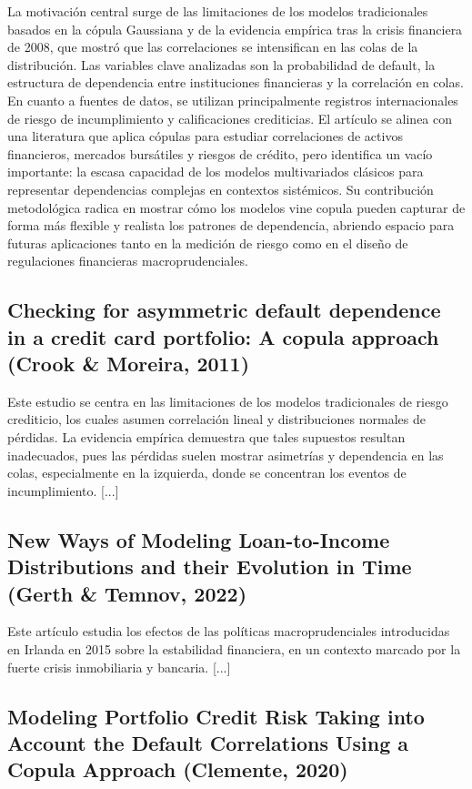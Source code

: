 \documentclass[11pt,a4paper]{article}
\begin{document}
La motivación central surge de las limitaciones de los modelos tradicionales basados en la cópula Gaussiana \parencite{li1999} y de la evidencia empírica tras la crisis financiera de 2008, que mostró que las correlaciones se intensifican en las colas de la distribución. Las variables clave analizadas son la probabilidad de default, la estructura de dependencia entre instituciones financieras y la correlación en colas. En cuanto a fuentes de datos, se utilizan principalmente registros internacionales de riesgo de incumplimiento y calificaciones crediticias. El artículo se alinea con una literatura que aplica cópulas para estudiar correlaciones de activos financieros, mercados bursátiles y riesgos de crédito, pero identifica un vacío importante: la escasa capacidad de los modelos multivariados clásicos para representar dependencias complejas en contextos sistémicos. Su contribución metodológica radica en mostrar cómo los modelos vine copula pueden capturar de forma más flexible y realista los patrones de dependencia, abriendo espacio para futuras aplicaciones tanto en la medición de riesgo como en el diseño de regulaciones financieras macroprudenciales.

\subsection{Checking for asymmetric default dependence in a credit card portfolio: A copula approach (Crook \& Moreira, 2011)}

Este estudio se centra en las limitaciones de los modelos tradicionales de riesgo crediticio, los cuales asumen correlación lineal y distribuciones normales de pérdidas. La evidencia empírica demuestra que tales supuestos resultan inadecuados, pues las pérdidas suelen mostrar asimetrías y dependencia en las colas, especialmente en la izquierda, donde se concentran los eventos de incumplimiento. [...]

\subsection{New Ways of Modeling Loan-to-Income Distributions and their Evolution in Time (Gerth \& Temnov, 2022)}

Este artículo estudia los efectos de las políticas macroprudenciales introducidas en Irlanda en 2015 sobre la estabilidad financiera, en un contexto marcado por la fuerte crisis inmobiliaria y bancaria. [...]

\subsection{Modeling Portfolio Credit Risk Taking into Account the Default Correlations Using a Copula Approach (Clemente, 2020)}
\end{document}
